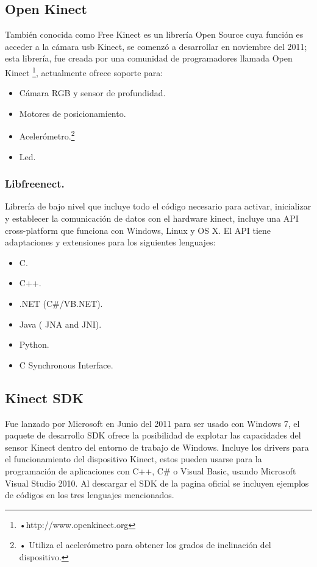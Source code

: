 \documentclass[11pt,a4paper]{article}
\begin{document}
\subsection{Open Kinect}
También conocida como Free Kinect es un librería Open Source cuya función es acceder a la cámara usb Kinect, se comenzó a desarrollar en noviembre del 2011; esta librería, fue creada por una comunidad de programadores llamada Open Kinect \footnote{•http://www.openkinect.org}, actualmente ofrece soporte para:
\begin{itemize}
\item Cámara RGB y sensor de profundidad.
\item Motores de posicionamiento.
\item Acelerómetro.\footnote{• Utiliza el acelerómetro para obtener los grados de inclinación del dispositivo.}
\item Led.
\end{itemize}
\subsubsection{Libfreenect.}
Librería de bajo nivel que incluye todo el código necesario para activar, inicializar y establecer la comunicación de datos con el hardware kinect, incluye una API cross-platform que funciona con Windows, Linux  y OS X. El API tiene adaptaciones y extensiones para los siguientes lenguajes:
\begin{itemize}
\item C.
\item C++.
\item .NET (C\#/VB.NET).
\item Java ( JNA and JNI).
\item Python.
\item C Synchronous Interface.
\end{itemize} 

\subsection{Kinect SDK}
Fue lanzado por Microsoft en Junio del 2011 para ser usado con Windows 7, el paquete de desarrollo SDK ofrece la posibilidad de explotar las capacidades del sensor Kinect dentro del entorno de trabajo de Windows. Incluye los drivers para el funcionamiento del dispositivo Kinect, estos pueden usarse para la programación de aplicaciones con C++, C\# o Visual Basic, usando Microsoft Visual Studio 2010. Al descargar el SDK de la pagina oficial se incluyen ejemplos de códigos en los tres lenguajes mencionados.
\end{document}
